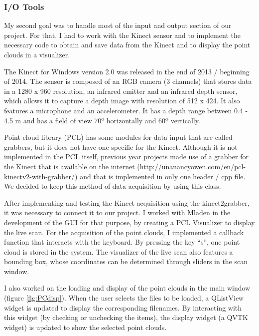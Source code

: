\documentclass[aps,letterpaper,11pt]{revtex4}
\begin{document}
\subsubsection{I/O Tools}
My second goal was to handle most of the input and output section of our project. For that, I had to work with the Kinect sensor and to implement the necessary code to obtain and save data from the Kinect and to display the point clouds in a visualizer.\par
The Kinect for Windows version 2.0 was released in the end of 2013 / beginning of 2014. The sensor is composed of an RGB camera (3 channels) that stores data in a 1280 x 960 resolution, an infrared emitter and an infrared depth sensor, which allows it to capture a depth image with resolution of 512 x 424. It also features a microphone and an accelerometer. It has a depth range between 0.4 - 4.5 m and has a field of view 70º horizontally and 60º vertically.\par
Point cloud library (PCL) has some modules for data input that are called grabbers, but it does not have one specific for the Kinect. Although it is not implemented in the PCL itself, previous year projects made use of a grabber for the Kinect that is available on the internet (\url{http://unanancyowen.com/en/pcl-kinectv2-with-grabber/}) and that is implemented in only one header / cpp file. We decided to keep this method of data acquisition by using this class.\par
After implementing and testing the Kinect acquisition using the kinect2grabber, it was necessary to connect it to our project. I worked with Mladen in the development of the GUI for that purpose, by creating a PCL Visualizer to display the live scan. For the acquisition of the point clouds, I implemented a callback function that interacts with the keyboard. By pressing the key “s”, one point cloud is stored in the system. The visualizer of the live scan also features a bounding box, whose coordinates can be determined through sliders in the scan window.\par
I also worked on the loading and display of the point clouds in the main window (figure \ref {fig:PCdisp}). When the user selects the files to be loaded, a QListView widget is updated to display the corresponding filenames. By interacting with this widget (by checking or unchecking the items), the display widget (a QVTK widget) is updated to show the selected point clouds.\par
\end{document}
